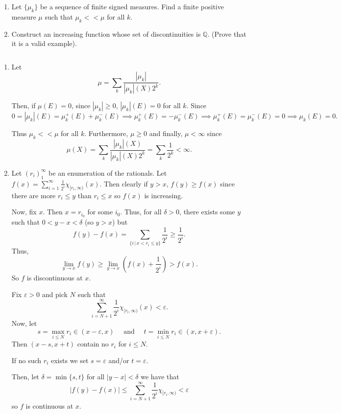 \documentclass[12pt]{Homework}
\begin{document}
\begin{problem} $\,$
\begin{enumerate}[label=(\alph*)]
    \item Let $\{\mu_k\}$ be a sequence of finite signed measures. Find a finite positive measure $\mu$ such that $\mu_k<<\mu$ for all $k$.
    \item Construct an increasing function whose set of discontinuities is $\mathbb{Q}$. (Prove that it is a valid example).
\end{enumerate}
\end{problem}


\begin{solution}$\,$
\begin{enumerate}[label=(\alph*)]
    \item Let $$\mu=\sum_k\frac{|\mu_k|}{|\mu_k|(X)2^k}.$$
    
    Then, if $\mu(E)=0$, since $|\mu_k|\ge0$, $|\mu_k|(E)=0$ for all $k$. Since $$0=|\mu_k|(E)=\mu_k^+(E)+\mu_k^-(E)\implies \mu_k^+(E)=-\mu_k^-(E)\implies \mu_k^+(E)=\mu_k^-(E)=0\implies\mu_k(E)=0.$$
    
    Thus $\mu_k<<\mu$ for all $k$. Furthermore, $\mu\ge0$ and finally, $\mu<\infty$ since $$\mu(X)=\sum_k\frac{|\mu_k|(X)}{|\mu_k|(X)2^k}=\sum_k\frac{1}{2^k}<\infty.$$
    \item Let $(r_i)_1^\infty$ be an enumeration of the rationals. Let $f(x)=\sum_{i=1}^\infty\frac{1}{2^i}\chi_{[r_i,\infty)}(x).$ Then clearly if $y>x$, $f(y)\ge f(x)$ since there are more $r_i\le y$  than $r_i\le x$ so $f(x)$ is increasing.
    
    Now, fix $x$.
     Then $x=r_{i_0}$ for some $i_0$. Thus, for all $\delta>0$, there exists some $y$ such that $0<y-x<\delta$ (so $y>x$) but $$f(y)-f(x)=\sum_{\{i\,|\,x<r_i\le y\}}\frac{1}{2^i}\ge\frac{1}{2^i}.$$ Thus, $$\lim_{y\to x}f(y)\ge \lim_{y\to x}\left(f(x)+\frac{1}{2^i}\right)>f(x).$$ So $f$ is discontinuous at $x$. 
    
     Fix $\varepsilon>0$ and pick $N$ such that $$\sum_{i=N+1}^\infty\frac{1}{2^i}\chi_{[r_i,\infty)}(x)<\varepsilon.$$ Now, let $$s=\max_{i\le N}r_i\in(x-\varepsilon,x)\quad\text{ and }\quad t=\min_{i\le N}r_i\in(x,x+\varepsilon).$$ Then $(x-s,x+t)$ contain no $r_i$ for $i\le N$.
    
    If no such $r_i$ exists we set $s=\varepsilon$ and/or $t=\varepsilon$.
    
    Then, let $\delta=\min\{s,t\}$ for all $|y-x|<\delta$ we have that $$|f(y)-f(x)|\le\sum_{i=N+1}^\infty\frac{1}{2^i}\chi_{[r_i,\infty)}<\varepsilon$$ so $f$ is continuous at $x.$
\end{enumerate}
\end{solution}
\newpage
\end{document}
